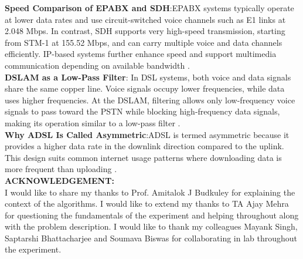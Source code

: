 \documentclass[a4paper,12pt]{article}
\begin{document}
\noindent
\textbf{Speed Comparison of EPABX and SDH}:EPABX systems typically operate at lower data rates and use circuit-switched voice channels such as E1 links at 2.048 Mbps. In contrast, SDH supports very high-speed transmission, starting from STM-1 at 155.52 Mbps, and can carry multiple voice and data channels efficiently. IP-based systems further enhance speed and support multimedia communication depending on available bandwidth \cite{civilsdaily_epabx_modern_communication, vasexperts_sdh_glossary}.\\

\noindent
\textbf{DSLAM as a Low-Pass Filter}: In DSL systems, both voice and data signals share the same copper line. Voice signals occupy lower frequencies, while data uses higher frequencies. At the DSLAM, filtering allows only low-frequency voice signals to pass toward the PSTN while blocking high-frequency data signals, making its operation similar to a low-pass filter \cite{geeksforgeeks_dslam}.\\

\noindent
\textbf{Why ADSL Is Called Asymmetric}:ADSL is termed asymmetric because it provides a higher data rate in the downlink direction compared to the uplink. This design suits common internet usage patterns where downloading data is more frequent than uploading \cite{wikipedia_adsl_2026}.\\

\noindent
\textbf{ACKNOWLEDGEMENT: }\\
I would like to share my thanks to Prof. Amitalok J Budkuley for explaining the context of the algorithms. I would like to extend my thanks to TA Ajay Mehra for questioning the fundamentals of the experiment and helping throughout along with the problem description. I would like to thank my colleagues Mayank Singh, Saptarshi Bhattacharjee and Soumava Biswas for collaborating in lab throughout the experiment. \\

\noindent
\printbibliography
\end{document}
